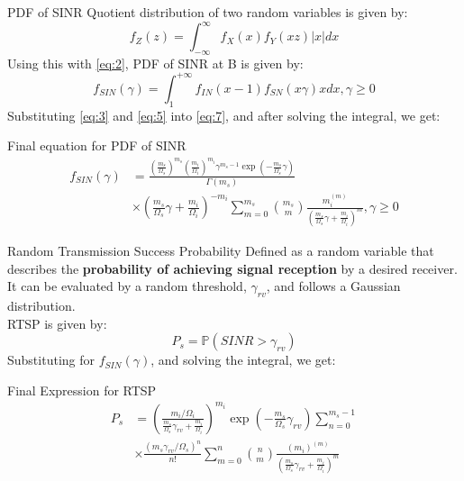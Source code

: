 \documentclass{beamer}
\providecommand{\brak}[1]{\ensuremath{\left(#1\right)}}
\providecommand{\Mod}[1]{\ensuremath{\left\lvert#1\right\rvert}}
\begin{document}
\begin{frame}{PDF of SINR}
    Quotient distribution of two random variables is given by:
    \begin{equation}
        f_{Z}\brak{z}=\int_{-\infty}^{\infty}f_{X}\brak{x}f_{Y}\brak{xz}\Mod{x}dx\nonumber
    \end{equation}
    Using this with \eqref{eq:2}, PDF of SINR at B is given by:
    \begin{equation}
        f_{SIN}\brak{\gamma} = \int_{1}^{+\infty}f_{IN}\brak{x-1}f_{SN}\brak{x\gamma}xdx, \gamma\geq{0}\label{eq:7}
    \end{equation}
    Substituting \eqref{eq:3} and \eqref{eq:5} into \eqref{eq:7}, and after solving the integral, we get:
    \begin{block}{Final equation for PDF of SINR}
    \begin{equation}
    \begin{split}
        f_{SIN}\brak{\gamma}&=\frac{\brak{\frac{m_{s}}{\Omega_{s}}}^{m_{s}}\brak{\frac{m_{i}}{\Omega_{i}}}^{m_{i}}\gamma^{m_{s}-1}\exp\brak{-\frac{m_{s}}{\Omega_{s}}\gamma}}{\Gamma\brak{m_{s}}}\\
        &\times
        \brak{\frac{m_{s}}{\Omega_{s}}\gamma+\frac{m_{i}}{\Omega_{i}}}^{-m_{i}}
        \sum_{m=0}^{m_{s}}\binom{m_{s}}{m}\frac{m_{i}^{\brak{m}}}{\brak{\frac{m_{s}}{\Omega_{s}}\gamma+\frac{m_{i}}{\Omega_{i}}}^{m}},\gamma\geq{0}
    \end{split}
    \end{equation}
    \end{block}
\end{frame}
\begin{frame}{Random Transmission Success Probability}
    Defined as a random variable that describes the \textbf{probability of achieving signal reception} by a desired receiver.\\
    It can be evaluated by a random threshold, $\gamma_{rv}$, and follows a Gaussian distribution.\\
    RTSP is given by:
    \begin{equation}
        P_{s}=\mathbb{P}\brak{SINR>\gamma_{rv}}\label{eq:13}
    \end{equation}
    Substituting for $f_{SIN}\brak{\gamma}$, and solving the integral, we get:
    \begin{block}{Final Expression for RTSP}
    \begin{equation}
    \begin{split}
        P_{s}&=\brak{\frac{m_{i}/\Omega_{i}}{\frac{m_{s}}{\Omega_{s}}\gamma_{rv}+\frac{m_{i}}{\Omega_{i}}}}^{m_{i}}\exp\brak{-\frac{m_{s}}{\Omega_{s}}\gamma_{rv}}\sum_{n=0}^{m_{s}-1}\\
        &\times\frac{\brak{m_{s}\gamma_{rv}/\Omega_{s}}^{n}}{n!}\sum_{m=0}^{n}\binom{n}{m}\frac{\brak{m_{i}}^{\brak{m}}}{\brak{\frac{m_{s}}{\Omega_{s}}\gamma_{rv}+\frac{m_{i}}{\Omega_{i}}}^{m}}
    \end{split}
    \end{equation}
    \end{block}
\end{frame}
\end{document}
